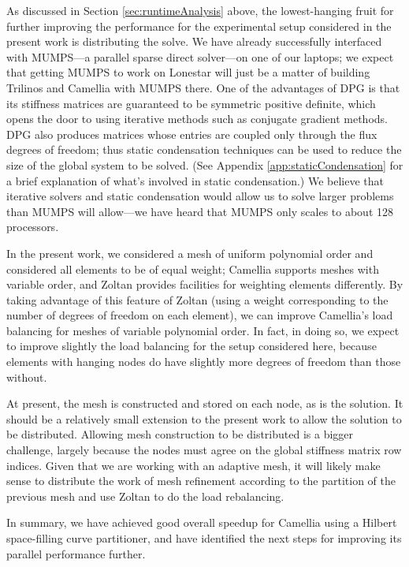 \documentclass{article}
\begin{document}
As discussed in Section \ref{sec:runtimeAnalysis} above, the lowest-hanging fruit for further improving the performance for the experimental setup considered in the present work is distributing the solve.  We have already successfully interfaced with MUMPS---a parallel sparse direct solver---on one of our laptops; we expect that getting MUMPS to work on Lonestar will just be a matter of building Trilinos and Camellia with MUMPS there.  One of the advantages of DPG is that its stiffness matrices are guaranteed to be symmetric positive definite, which opens the door to using iterative methods such as conjugate gradient methods.  DPG also produces matrices whose entries are coupled only through the flux degrees of freedom; thus static condensation techniques can be used to reduce the size of the global system to be solved.  (See Appendix \ref{app:staticCondensation} for a brief explanation of what's involved in static condensation.)  We believe that iterative solvers and static condensation would allow us to solve larger problems than MUMPS will allow---we have heard that MUMPS only scales to about 128 processors.

In the present work, we considered a mesh of uniform polynomial order and considered all elements to be of equal weight; Camellia supports meshes with variable order, and Zoltan provides facilities for weighting elements differently.  By taking advantage of this feature of Zoltan (using a weight corresponding to the number of degrees of freedom on each element), we can improve Camellia's load balancing for meshes of variable polynomial order.  In fact, in doing so, we expect to improve slightly the load balancing for the setup considered here, because elements with hanging nodes do have slightly more degrees of freedom than those without.

At present, the mesh is constructed and stored on each node, as is the solution.  It should be a relatively small extension to the present work to allow the solution to be distributed.  Allowing mesh construction to be distributed is a bigger challenge, largely because the nodes must agree on the global stiffness matrix row indices.  Given that we are working with an adaptive mesh, it will likely make sense to distribute the work of mesh refinement according to the partition of the previous mesh and use Zoltan to do the load rebalancing.

In summary, we have achieved good overall speedup for Camellia using a Hilbert space-filling curve partitioner, and have identified the next steps for improving its parallel performance further.
\end{document}
